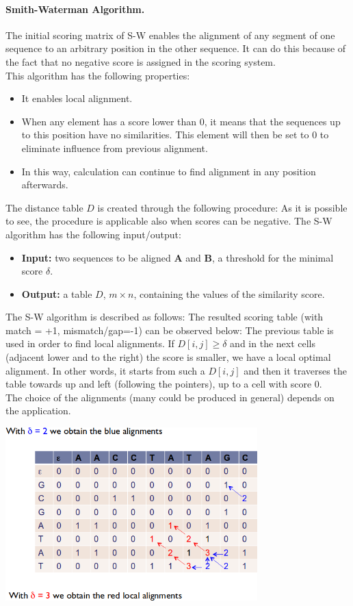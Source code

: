 \paragraph*{Smith-Waterman Algorithm.} The initial scoring matrix of S-W enables the alignment  of  any segment of one sequence to an arbitrary position in the other sequence. It can do this because of the fact that no negative score is assigned in the scoring system.\\
This algorithm has the following properties:
\begin{itemize}
	\item It enables local alignment.
	\item When any element has a score lower than 0, it means that the sequences up to this position have no similarities. This element will then be set to 0 to eliminate influence from previous alignment.
	\item In this way, calculation can continue to find alignment in any position afterwards.
\end{itemize}
The distance table $D$ is created through the following procedure:
As it is possible to see, the procedure is applicable also when scores can be negative. The S-W algorithm has the following input/output:
\begin{itemize}
	\item \textbf{Input:} two sequences to be aligned \textbf{A} and \textbf{B}, a threshold for the minimal score $\delta$.
	\item \textbf{Output:} a table $D$, $m \times n$, containing the values of the similarity score.
\end{itemize} 
The S-W algorithm is described as follows:
The resulted scoring table (with match = +1, mismatch/gap=-1) can be observed below:
The previous table is used in order to find local alignments. If $D[i,j] \geq \delta$ and in the next cells (adjacent lower and to the right) the score is smaller, we have a local optimal alignment. In other words, it starts from such a $D[i,j]$ and then it traverses the table towards up and left (following the pointers), up to a cell with score 0.\\
The choice of the alignments (many could be produced in general) depends on the application.
\begin{center}
	\includegraphics[width=0.73\textwidth]{img/SW4}
\end{center}


